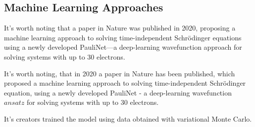 \subsection{Machine Learning Approaches}

It's worth noting that a paper in Nature was published in 2020, proposing a machine learning approach to solving time-independent Schr{\"o}dinger equations using a newly developed PauliNet—a deep-learning wavefunction approach for solving systems with up to 30 electrons.

It's worth noting, that in 2020 a paper in Nature has been published, which proposed a machine learning approach to solving time-independent Schr{\"o}dinger equation, using a newly developed PauliNet - a deep-learning wavefunction $ansatz$ for solving systems with up to 30 electrons.

It's creators trained the model using data obtained with variational Monte Carlo.
\cite{hermann_deep-neural-network_2020}

